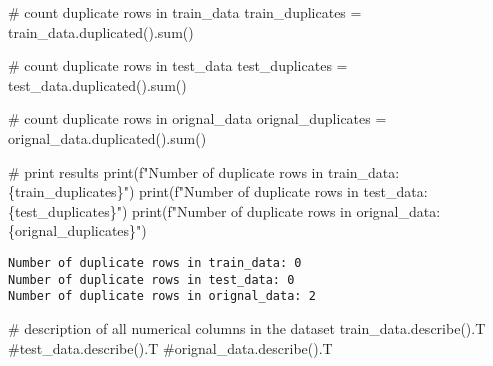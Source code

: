 \documentclass[
  letterpaper,
  DIV=11,
  numbers=noendperiod]{scrartcl}
\newenvironment{Shaded}{\begin{snugshade}}{\end{snugshade}}
\newcommand{\BuiltInTok}[1]{\textcolor[rgb]{0.00,0.23,0.31}{#1}}
\newcommand{\CommentTok}[1]{\textcolor[rgb]{0.37,0.37,0.37}{#1}}
\newcommand{\NormalTok}[1]{\textcolor[rgb]{0.00,0.23,0.31}{#1}}
\newcommand{\OperatorTok}[1]{\textcolor[rgb]{0.37,0.37,0.37}{#1}}
\newcommand{\SpecialCharTok}[1]{\textcolor[rgb]{0.37,0.37,0.37}{#1}}
\newcommand{\SpecialStringTok}[1]{\textcolor[rgb]{0.13,0.47,0.30}{#1}}
\begin{document}
\begin{Shaded}
\begin{Highlighting}[]
\CommentTok{\# count duplicate rows in train\_data}
\NormalTok{train\_duplicates }\OperatorTok{=}\NormalTok{ train\_data.duplicated().}\BuiltInTok{sum}\NormalTok{()}

\CommentTok{\# count duplicate rows in test\_data}
\NormalTok{test\_duplicates }\OperatorTok{=}\NormalTok{ test\_data.duplicated().}\BuiltInTok{sum}\NormalTok{()}

\CommentTok{\# count duplicate rows in orignal\_data}
\NormalTok{orignal\_duplicates }\OperatorTok{=}\NormalTok{ orignal\_data.duplicated().}\BuiltInTok{sum}\NormalTok{()}

\CommentTok{\# print results}
\BuiltInTok{print}\NormalTok{(}\SpecialStringTok{f"Number of duplicate rows in train\_data: }\SpecialCharTok{\{}\NormalTok{train\_duplicates}\SpecialCharTok{\}}\SpecialStringTok{"}\NormalTok{)}
\BuiltInTok{print}\NormalTok{(}\SpecialStringTok{f"Number of duplicate rows in test\_data: }\SpecialCharTok{\{}\NormalTok{test\_duplicates}\SpecialCharTok{\}}\SpecialStringTok{"}\NormalTok{)}
\BuiltInTok{print}\NormalTok{(}\SpecialStringTok{f"Number of duplicate rows in orignal\_data: }\SpecialCharTok{\{}\NormalTok{orignal\_duplicates}\SpecialCharTok{\}}\SpecialStringTok{"}\NormalTok{)}
\end{Highlighting}
\end{Shaded}

\begin{verbatim}
Number of duplicate rows in train_data: 0
Number of duplicate rows in test_data: 0
Number of duplicate rows in orignal_data: 2
\end{verbatim}

\begin{Shaded}
\begin{Highlighting}[]
\CommentTok{\# description of all numerical columns in the dataset}
\NormalTok{train\_data.describe().T}
\CommentTok{\#test\_data.describe().T}
\CommentTok{\#orignal\_data.describe().T}
\end{Highlighting}
\end{Shaded}
\end{document}
